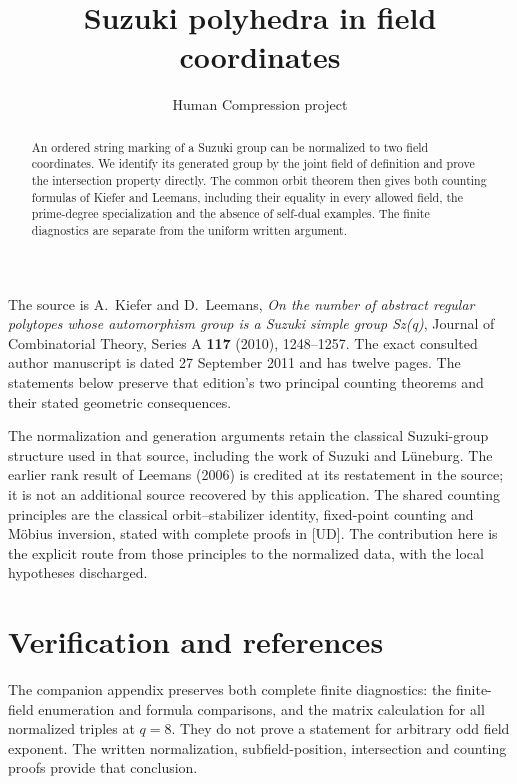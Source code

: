 
\title{Suzuki polyhedra in field coordinates}
\author{Human Compression project}
\date{}

\maketitle
\begin{abstract}
An ordered string marking of a Suzuki group can be normalized to two field
coordinates. We identify its generated group by the joint field of definition
and prove the intersection property directly. The common orbit theorem then
gives both counting formulas of Kiefer and Leemans, including their equality
in every allowed field, the prime-degree specialization and the absence of
self-dual examples. The finite diagnostics are separate from the uniform
written argument.
\end{abstract}
The source is A.~Kiefer and D.~Leemans, \emph{On the number of abstract regular
polytopes whose automorphism group is a Suzuki simple group Sz(q)},
Journal of Combinatorial Theory, Series A \textbf{117} (2010), 1248--1257.
The exact consulted author manuscript is dated 27 September 2011 and has
twelve pages. The statements below preserve that edition's two principal
counting theorems and their stated geometric consequences.

The normalization and generation arguments retain the classical Suzuki-group
structure used in that source, including the work of Suzuki and L\"uneburg.
The earlier rank result of Leemans (2006) is credited at its restatement in
the source; it is not an additional source recovered by this application.
The shared counting principles are the classical orbit--stabilizer identity,
fixed-point counting and M\"obius inversion, stated with complete proofs in
[UD]. The contribution here is the explicit route from those principles to
the normalized data, with the local hypotheses discharged.


\section*{Verification and references}
The companion appendix preserves both complete finite diagnostics: the
finite-field enumeration and formula comparisons, and the matrix calculation
for all normalized triples at $q=8$. They do not prove a statement for
arbitrary odd field exponent. The written normalization, subfield-position,
intersection and counting proofs provide that conclusion.

